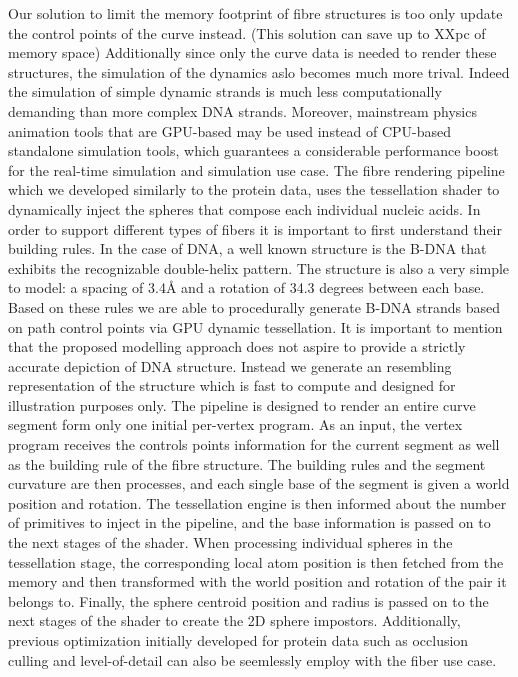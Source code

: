 Our solution to limit the memory footprint of fibre structures is too only update the control points of the curve instead.
(This solution can save up to XXpc of memory space)
Additionally since only the curve data is needed to render these structures, the simulation of the dynamics aslo becomes much more trival.
Indeed the simulation of simple dynamic strands is much less computationally demanding than more complex DNA strands.
Moreover, mainstream physics animation tools that are GPU-based may be used instead of CPU-based standalone simulation tools, which guarantees a considerable performance boost for the real-time simulation and simulation use case.
The fibre rendering pipeline which we developed similarly to the protein data, uses the tessellation shader to dynamically inject the spheres that compose each individual nucleic acids.
In order to support different types of fibers it is important to first understand their building rules.
In the case of DNA, a well known structure is the B-DNA that exhibits the recognizable double-helix pattern.
The structure is also a very simple to model: a spacing of 3.4Å and a rotation of 34.3 degrees between each base. 
Based on these rules we are able to procedurally generate B-DNA strands based on path control points via GPU dynamic tessellation.
It is important to mention that the proposed modelling approach does not aspire to provide a strictly accurate depiction of DNA structure.
Instead we generate an resembling representation of the structure which is fast to compute and designed for illustration purposes only.
The pipeline is designed to render an entire curve segment form only one initial per-vertex program.
As an input, the vertex program receives the controls points information for the current segment as well as the building rule of the fibre structure.
The building rules and the segment curvature are then processes, and each single base of the segment is given a world position and rotation.
The tessellation engine is then informed about the number of primitives to inject in the pipeline, and the base information is passed on to the next stages of the shader.
When processing individual spheres in the tessellation stage, the corresponding local atom position is then fetched from the memory and then transformed with the world position and rotation of the pair it belongs to.
Finally, the sphere centroid position and radius is passed on to the next stages of the shader to create the 2D sphere impostors.
Additionally, previous optimization initially developed for protein data such as occlusion culling and level-of-detail can also be seemlessly employ with the fiber use case.


